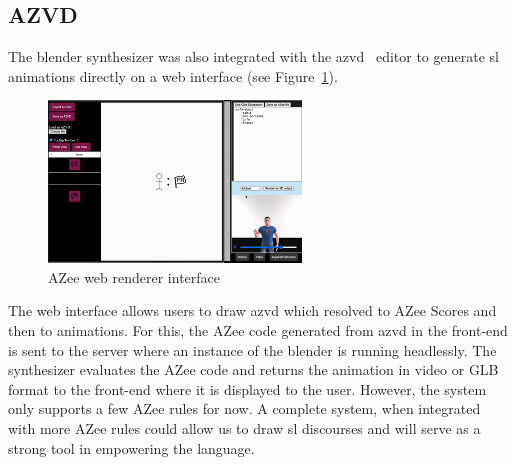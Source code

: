 \documentclass[../../main.tex]{subfiles}
\begin{document}
\subsection{AZVD}
\label{ch:conclusion:future:realistic_avatars}

The blender synthesizer was also integrated with the \gls{azvd}~\cite{filhol2024software} editor to generate \gls{sl} animations directly on a web interface (see Figure~\ref{fig:conclusion:azee_web_interface}).

\begin{figure}[ht]
    \centering
    \includegraphics[width=0.6\textwidth]{chapters/conclusion/images/azee_web_interface.png}
    \caption{AZee web renderer interface}
    \label{fig:conclusion:azee_web_interface}
\end{figure}

The web interface allows users to draw \gls{azvd} which resolved to AZee Scores and then to animations. For this, the AZee code generated from \gls{azvd} in the front-end is sent to the server where an instance of the blender is running headlessly. The synthesizer evaluates the AZee code and returns the animation in video or GLB format to the front-end where it is displayed to the user. However, the system only supports a few AZee rules for now. A complete system, when integrated with more AZee rules could allow us to draw \gls{sl} discourses and will serve as a strong tool in empowering the language.
\end{document}

